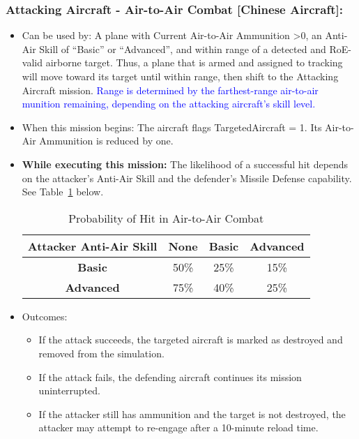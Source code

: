 \documentclass{article}
\begin{document}
        \subsubsection{Attacking Aircraft - Air-to-Air Combat [Chinese Aircraft]:}
            \begin{itemize}
                \item Can be used by: A plane with Current Air-to-Air Ammunition \textgreater 0, an Anti-Air Skill of ``Basic'' or ``Advanced'', and within range of a detected and RoE-valid airborne target. Thus, a plane that is armed and assigned to tracking will move toward its target until within range, then shift to the Attacking Aircraft mission. \textcolor{blue}{Range is determined by the farthest-range air-to-air munition remaining, depending on the attacking aircraft's skill level.}
            
                \item When this mission begins: The aircraft flags TargetedAircraft = 1. Its Air-to-Air Ammunition is reduced by one.
            
                \item \textbf{While executing this mission:} The likelihood of a successful hit depends on the attacker's Anti-Air Skill and the defender's Missile Defense capability. See Table~\ref{table:AirToAirHitChances} below.
            
                \begin{table}[h!]
                \centering
                \caption{Probability of Hit in Air-to-Air Combat}
                \label{table:AirToAirHitChances}
                \begin{tabular}{|c|c|c|c|}
                    \hline
                    \textbf{Attacker Anti-Air Skill} & \textbf{None} & \textbf{Basic} & \textbf{Advanced} \\
                    \hline
                    \textbf{Basic}    & 50\%  & 25\%  & 15\% \\
                    \textbf{Advanced} & 75\%  & 40\%  & 25\% \\
                    \hline
                \end{tabular}
                \end{table}

                \item Outcomes:
                \begin{itemize}
                    \item If the attack succeeds, the targeted aircraft is marked as destroyed and removed from the simulation.
                    \item If the attack fails, the defending aircraft continues its mission uninterrupted.
                    \item If the attacker still has ammunition and the target is not destroyed, the attacker may attempt to re-engage after a 10-minute reload time.
                \end{itemize}
            

\end{itemize}
\end{document}
